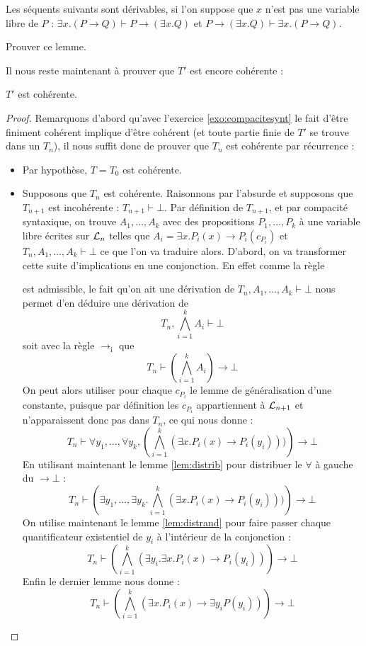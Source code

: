 \begin{lem}\label{lem:exidroite}
    Les séquents suivants sont dérivables, si l'on suppose que $x$ n'est pas une variable libre de $P$ : $\exists x.(P\to Q)\vdash P\to (\exists x.Q)$ et $P\to (\exists x.Q)\vdash \exists x.(P\to Q)$.
\end{lem}

\begin{exo}
    Prouver ce lemme.
\end{exo}

Il nous reste maintenant à prouver que $T'$ est encore cohérente :

\begin{prop}[Cohérence de $T'$]
    $T'$ est cohérente.
\end{prop}

\begin{proof}
    Remarquons d'abord qu'avec l'exercice \ref{exo:compacitesynt}  le fait d'être finiment cohérent implique d'être cohérent (et toute partie finie de $T'$ se trouve dans un $T_n$), il nous suffit donc de prouver que $T_n$ est cohérente par récurrence :
    \begin{itemize}[label=$\bullet$]
        \item Par hypothèse, $T=T_0$ est cohérente.
        \item Supposons que $T_n$ est cohérente. Raisonnons par l'absurde et supposons que $T_{n+1}$ est incohérente : $T_{n+1}\vdash \bot$. Par définition de $T_{n+1}$, et par compacité syntaxique, on trouve $A_1,\ldots ,A_k$ avec des propositions $P_1,\ldots,P_k$ à une variable libre écrites sur $\LL_n$ telles que $A_i = \exists x.P_i(x) \to P_i(c_{P_i})$ et $T_n,A_1,\ldots,A_k\vdash \bot$ ce que l'on va traduire alors. D'abord, on va transformer cette suite d'implications en une conjonction. En effet comme la règle \begin{prooftree}  \end{prooftree} est admissible, le fait qu'on ait une dérivation de $T_n,A_1,\ldots,A_k\vdash \bot$ nous permet d'en déduire une dérivation de $$T_n,\bigwedge_{i=1}^k A_i\vdash \bot$$ soit avec la règle $\to_\mathrm i$ que $$T_n\vdash \left( \bigwedge_{i=1}^k A_i \right)\to \bot$$
        On peut alors utiliser pour chaque $c_{P_i}$ le lemme de généralisation d'une constante, puisque par définition les $c_{P_i}$ appartiennent à $\LL_{n+1}$ et n'apparaissent donc pas dans $T_n$, ce qui nous donne : $$T_n\vdash \forall y_1,\ldots,\forall y_k, \left( \bigwedge_{i=1}^k (\exists x. P_i(x)\to P_i(y_i)))\right)\to \bot$$ En utilisant maintenant le lemme \ref{lem:distrib} pour distribuer le $\forall$ à gauche du $\to \bot$ : $$T_n\vdash \left(\exists y_1,\ldots,\exists y_k. \bigwedge_{i=1}^k (\exists x.P_i(x)\to P_i(y_i)))\right)\to \bot$$ On utilise maintenant le lemme \ref{lem:distrand} pour faire passer chaque quantificateur existentiel de $y_i$ à l'intérieur de la conjonction : $$T_n\vdash \left(\bigwedge_{i=1}^k (\exists y_i.\exists x. P_i(x)\to P_i(y_i))\right)\to \bot$$ Enfin le dernier lemme nous donne : $$T_n\vdash \left(\bigwedge_{i=1}^k (\exists x. P_i(x) \to \exists y_i P(y_i))\right)\to\bot$$


\end{itemize}
\end{proof}
